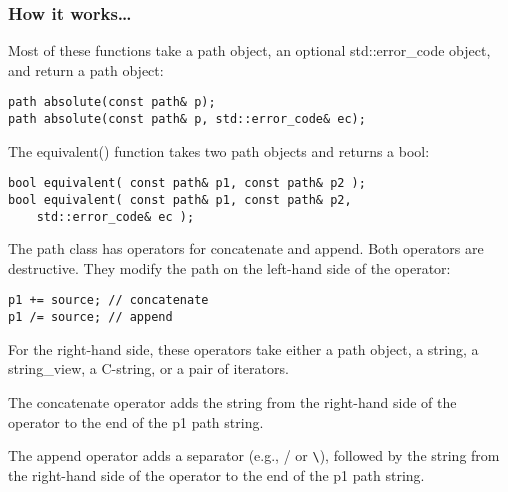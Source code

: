 \subsubsection{How it works…}

Most of these functions take a path object, an optional std::error\_code object, and return a path object:

\begin{lstlisting}[style=styleCXX]
path absolute(const path& p);
path absolute(const path& p, std::error_code& ec);
\end{lstlisting}

The equivalent() function takes two path objects and returns a bool:

\begin{lstlisting}[style=styleCXX]
bool equivalent( const path& p1, const path& p2 );
bool equivalent( const path& p1, const path& p2,
	std::error_code& ec );
\end{lstlisting}

The path class has operators for concatenate and append. Both operators are destructive. They modify the path on the left-hand side of the operator:

\begin{lstlisting}[style=styleCXX]
p1 += source; // concatenate
p1 /= source; // append
\end{lstlisting}

For the right-hand side, these operators take either a path object, a string, a string\_view, a C-string, or a pair of iterators.

The concatenate operator adds the string from the right-hand side of the operator to the end of the p1 path string.

The append operator adds a separator (e.g., / or \verb|\|), followed by the string from the right-hand side of the operator to the end of the p1 path string.







